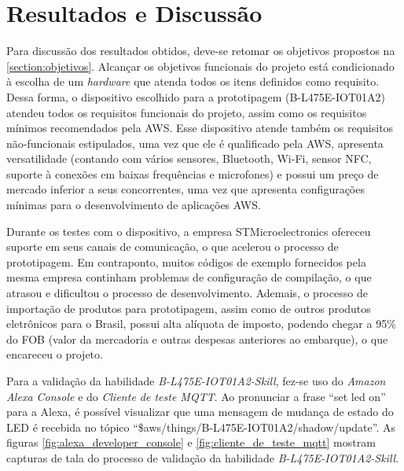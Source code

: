 \chapter{Resultados e Discussão}\label{chapter:resultados_e_discussoes}

Para discussão dos resultados obtidos, deve-se retomar os objetivos propostos na \autoref{section:objetivos}. Alcançar os objetivos funcionais do projeto está condicionado à escolha de um \textit{hardware} que atenda todos os itens definidos como requisito. Dessa forma, o dispositivo escolhido para a prototipagem (B-L475E-IOT01A2) atendeu todos os requisitos funcionais do projeto, assim como os requisitos mínimos recomendados pela AWS. Esse dispositivo atende também os requisitos não-funcionais estipulados, uma vez que ele é qualificado pela AWS, apresenta versatilidade (contando com vários sensores, Bluetooth, Wi-Fi, sensor NFC, suporte à conexões em baixas frequências e microfones) e possui um preço de mercado inferior a seus concorrentes, uma vez que apresenta configurações mínimas para o desenvolvimento de aplicações AWS.

Durante os testes com o dispositivo, a empresa STMicroelectronics ofereceu suporte em seus canais de comunicação, o que acelerou o processo de prototipagem. Em contraponto, muitos códigos de exemplo fornecidos pela mesma empresa continham problemas de configuração de compilação, o que atrasou e dificultou o processo de desenvolvimento. Ademais, o processo de importação de produtos para prototipagem, assim como de outros produtos eletrônicos para o Brasil, possui alta alíquota de imposto, podendo chegar a 95\% do FOB (valor da mercadoria e outras despesas anteriores ao embarque), o que encareceu o projeto.

Para a validação da habilidade \textit{B-L475E-IOT01A2-Skill}, fez-se uso do \textit{Amazon Alexa Console} e do \textit{Cliente de teste MQTT}. Ao pronunciar a frase ``set led on'' para a Alexa, é possível visualizar que uma mensagem de mudança de estado do LED é recebida no tópico ``\$aws/things/B-L475E-IOT01A2/shadow/update''. As figuras \autoref{fig:alexa_developer_console} e \autoref{fig:cliente_de_teste_mqtt} mostram capturas de tala do processo de validação da habilidade \textit{B-L475E-IOT01A2-Skill}.

